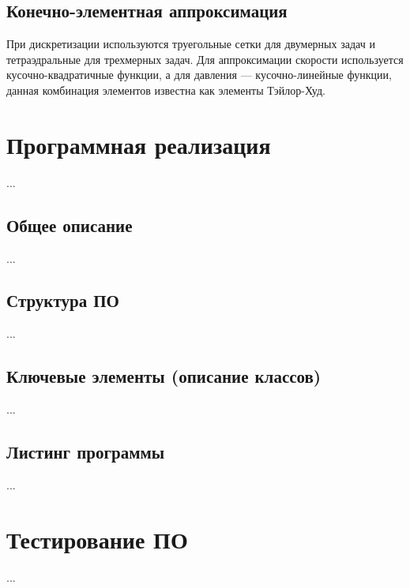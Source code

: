 \documentclass[a4paper,10pt]{report}
\begin{document}
\subsection{Конечно-элементная аппроксимация}

При дискретизации используются труегольные сетки для двумерных задач и тетраэдральные для трехмерных задач.
Для аппроксимации скорости используется кусочно-квадратичные функции, а для давления --- кусочно-линейные функции, данная комбинация элементов известна как элементы Тэйлор-Худ.

\section{Программная реализация}
...

\subsection{Общее описание}
...

\subsection{Структура ПО}
...

\subsection{Ключевые элементы (описание классов)}
...

\subsection{Листинг программы}
...

\section{Тестирование ПО}
...
\end{document}
